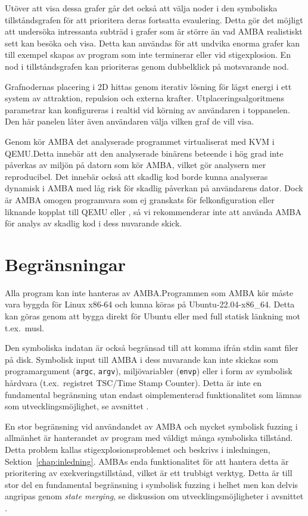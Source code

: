 Utöver att visa dessa grafer går det också att välja noder i den symboliska
tillståndsgrafen för att prioritera deras fortsatta evaulering. Detta gör det
möjligt att undersöka intressanta subträd i grafer som är större än vad AMBA
realistiskt sett kan besöka och visa. Detta kan användas för att undvika enorma
grafer kan till exempel skapas av program som inte terminerar eller vid
stigexplosion. En nod i tillståndsgrafen kan prioriteras genom dubbelklick på
motsvarande nod.

Grafnodernas placering i 2D hittas genom iterativ lösning för lägst energi i ett
system av attraktion, repulsion och externa krafter. Utplaceringsalgoritmens
parametrar kan konfigureras i realtid vid körning av användaren i toppanelen.
Den här panelen låter även användaren välja vilken graf de vill visa.

Genom \stoe{} kör AMBA det analyserade programmet virtualiserat med KVM i
QEMU.\@ Detta innebär att den analyserade binärens beteende i hög grad inte
påverkas av miljön på datorn som kör AMBA, vilket gör analysern mer
reproducibel. Det innebär också att skadlig kod borde kunna analyseras dynamisk
i AMBA med låg risk för skadlig påverkan på användarens dator. Dock är AMBA
omogen programvara som ej granskats för felkonfiguration eller liknande kopplat
till QEMU eller \stoe{}, så vi rekommenderar inte att använda AMBA för analys av
skadlig kod i dess nuvarande skick.

\section{Begränsningar}

Alla program kan inte hanteras av AMBA.\@ Programmen som AMBA kör måste vara
byggda för Linux x86-64 och kunna köras på Ubuntu-22.04-x86\_64. Detta kan göras
genom att bygga direkt för Ubuntu eller med full statisk länkning mot t.ex.\
musl.

Den symboliska indatan är också begränsad till att komma ifrån stdin samt filer
på disk. Symbolisk input till AMBA i dess nuvarande kan inte skickas som
programargument (\verb|argc|, \verb|argv|), miljövariabler (\verb|envp|) eller i
form av symbolisk hårdvara (t.ex.\ registret TSC/Time Stamp Counter). Detta är
inte en fundamental begränsning utan endast oimplementerad funktionalitet som
lämnas som utvecklingsmöjlighet, se avsnittet \nameref{sec:vidareutveckling}.

En stor begränsning vid användandet av AMBA och mycket symbolisk fuzzing i
allmänhet är hanterandet av program med väldigt många symboliska tillstånd.
Detta problem kallas stigexplosionsproblemet och beskrivs i inledningen,
Sektion~\ref{chap:inledning}. AMBAs enda funktionalitet för att hantera detta är
prioritering av exekveringstillstånd, vilket är ett trubbigt verktyg. Detta är
till stor del en fundamental begränsning i symbolisk fuzzing i helhet men kan
delvis angripas genom \textit{state merging}, se diskussion om
utvecklingsmöjligheter i avsnittet .

